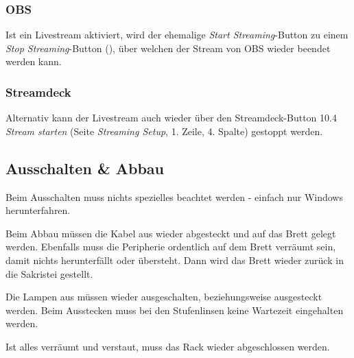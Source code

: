			\subsubsection{OBS}
				Ist ein Livestream aktiviert, wird der ehemalige \textit{Start Streaming}-Button zu einem \textit{Stop Streaming}-Button (), über welchen der Stream von OBS wieder beendet werden kann.
			\subsubsection{Streamdeck}
				Alternativ kann der Livestream auch wieder über den Streamdeck-Button 10.4 \textit{Stream starten} (Seite \textit{Streaming Setup}, 1. Zeile, 4. Spalte) gestoppt werden.
		\subsection{Ausschalten \& Abbau}
			Beim Ausschalten muss nichts spezielles beachtet werden - einfach nur Windows herunterfahren.
			
			Beim Abbau müssen die Kabel aus  wieder abgesteckt und auf das Brett gelegt werden.
			Ebenfalls muss die Peripherie ordentlich auf dem Brett verräumt sein, damit nichts herunterfällt oder übersteht.
			Dann wird das Brett wieder zurück in die Sakristei gestellt.

			Die Lampen aus  müssen wieder ausgeschalten, beziehungsweise ausgesteckt werden.
			Beim Ausstecken muss bei den Stufenlinsen keine Wartezeit eingehalten werden.

			Ist alles verräumt und verstaut, muss das Rack wieder abgeschlossen werden.